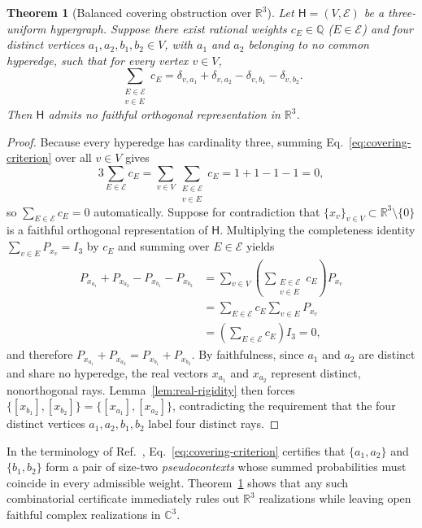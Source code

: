 \documentclass[twocolumn,aps,pra,floatfix,amsmath,amssymb,longbibliography]{revtex4-2}
\newenvironment{handrewrite}{\leavevmode\color{blue}}{}
\newtheorem{theorem}{Theorem}
\theoremstyle{definition}
\theoremstyle{remark}
\newcommand{\C}{\mathbb C}
\newcommand{\R}{\mathbb R}
\begin{document}
\begin{theorem}[Balanced covering obstruction over $\R^3$]
\label{thm:covering-criterion}
Let $\mathsf H=(V,\mathcal E)$ be a three-uniform hypergraph.  Suppose there
exist rational weights $c_E\in\mathbb Q$ ($E\in\mathcal E$) and four distinct
vertices $a_1,a_2,b_1,b_2\in V$, with $a_1$ and $a_2$ belonging to no common
hyperedge, such that for every vertex $v\in V$,
\begin{equation}
 \sum_{\substack{E\in\mathcal E\\ v\in E}} c_E
 =\delta_{v,a_1}+\delta_{v,a_2}-\delta_{v,b_1}-\delta_{v,b_2}.
 \label{eq:covering-criterion}
\end{equation}
Then $\mathsf H$ admits no faithful orthogonal representation in $\R^3$.
\end{theorem}

\begin{proof}
Because every hyperedge has cardinality three, summing
Eq.~\eqref{eq:covering-criterion} over all $v\in V$ gives
\[
 3\sum_{E\in\mathcal E} c_E
 =\sum_{v\in V}\sum_{\substack{E\in\mathcal E\\ v\in E}} c_E
 =1+1-1-1=0,
\]
so $\sum_{E\in\mathcal E} c_E=0$ automatically.  Suppose for contradiction
that $\{x_v\}_{v\in V}\subset\R^3\setminus\{0\}$ is a faithful orthogonal
representation of $\mathsf H$.  Multiplying the completeness identity
$\sum_{v\in E} P_{x_v}=I_3$ by $c_E$ and summing over $E\in\mathcal E$ yields
\begin{align*}
 P_{x_{a_1}}+P_{x_{a_2}}-P_{x_{b_1}}-P_{x_{b_2}}
 &=\sum_{v\in V}\!\left(\sum_{\substack{E\in\mathcal E\\ v\in E}} c_E\right)P_{x_v}\\
 &=\sum_{E\in\mathcal E} c_E\sum_{v\in E} P_{x_v}\\
 &=\left(\sum_{E\in\mathcal E} c_E\right)I_3=0,
\end{align*}
and therefore $P_{x_{a_1}}+P_{x_{a_2}}=P_{x_{b_1}}+P_{x_{b_2}}$.
By faithfulness, since $a_1$ and $a_2$ are distinct and share no hyperedge,
the real vectors $x_{a_1}$ and $x_{a_2}$ represent distinct, nonorthogonal
rays.  Lemma~\ref{lem:real-rigidity} then forces
$\{[x_{b_1}],[x_{b_2}]\}=\{[x_{a_1}],[x_{a_2}]\}$, contradicting the
requirement that the four distinct vertices $a_1,a_2,b_1,b_2$ label four
distinct rays.
\end{proof}

\begin{handrewrite}
In the terminology of Ref.~\cite{2026-Navara-Svozil-pseudocontexts},
Eq.~\eqref{eq:covering-criterion} certifies that $\{a_1,a_2\}$ and
$\{b_1,b_2\}$ form a pair of size-two \emph{pseudocontexts} whose summed
probabilities must coincide in every admissible weight.
Theorem~\ref{thm:covering-criterion} shows that any such combinatorial
certificate immediately rules out $\R^3$ realizations while leaving open
faithful complex realizations in $\C^3$.
\end{handrewrite}
\end{document}
